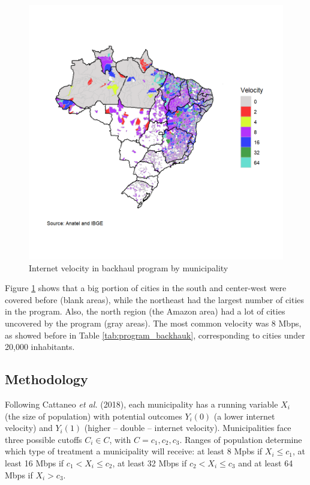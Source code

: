 \documentclass[
  12pt,
]{article}
\begin{document}
\begin{figure}
\centering
\includegraphics{artigo1_files/figure-latex/unnamed-chunk-1-1.png}
\caption{Internet velocity in backhaul program by municipality
\label{fig:1}}
\end{figure}

Figure \ref{fig:1} shows that a big portion of cities in the south and
center-west were covered before (blank areas), while the northeast had
the largest number of cities in the program. Also, the north region (the
Amazon area) had a lot of cities uncovered by the program (gray areas).
The most common velocity was 8 Mbps, as showed before in Table
\ref{tab:program_backhauk}, corresponding to cities under 20,000
inhabitants.

\hypertarget{methodology}{%
\subsection{Methodology}\label{methodology}}

Following Cattaneo \emph{et al.} (2018), each municipality has a running
variable \(X_i\) (the size of population) with potential outcomes
\(Y_i(0)\) (a lower internet velocity) and \(Y_i(1)\) (higher -- double
-- internet velocity). Municipalities face three possible cutoffs
\(C_i \in C\), with \(C = {c_1, c_2, c_3}\). Ranges of population
determine which type of treatment a municipality will receive: at least
8 Mpbs if \(X_i \leq c_1\), at least 16 Mbps if \(c_1 < X_i \leq c_2\),
at least 32 Mbps if \(c_2 < X_i \leq c_3\) and at least 64 Mbps if
\(X_i > c_3\).
\end{document}
